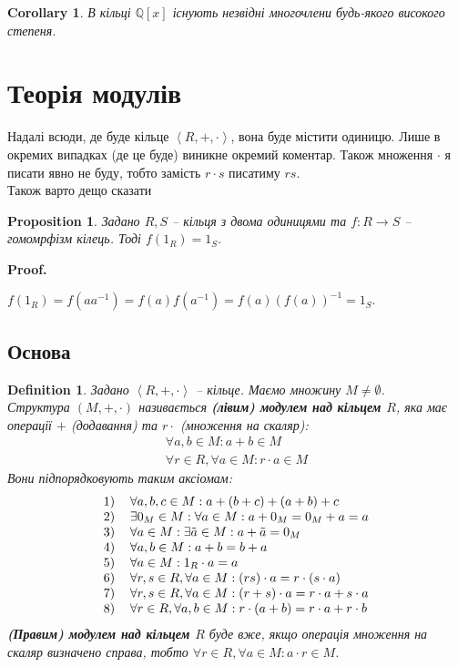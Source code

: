 \documentclass[a4paper, 10pt]{article}
\makeatletter
\theoremstyle{theoremdd}
\theoremstyle{theoremdd}
\newtheorem{definition}[theorem]{Definition}
\theoremstyle{theoremdd}
\theoremstyle{theoremdd}
\theoremstyle{theoremdd}
\theoremstyle{theoremdd}
\theoremstyle{theoremdd}
\theoremstyle{theoremdd}
\theoremstyle{theoremdd}
\newtheorem{proposition}[theorem]{Proposition}
\theoremstyle{theoremdd}
\theoremstyle{theoremdd}
\theoremstyle{theoremdd}
\theoremstyle{theoremdd}
\theoremstyle{theoremdd}
\newtheorem{corollary}[theorem]{Corollary}
\theoremstyle{theoremdd}
\renewenvironment{proof}[1][Proof.\\]{\par
\pushQED{\hfill \qed}%
\normalfont \topsep6\p@\@plus6\p@\relax
\trivlist
\item\relax
{\bfseries
#1\@addpunct{.}}\hspace\labelsep\ignorespaces
}{%
\popQED\endtrivlist\@endpefalse
}
\makeatother
\begin{document}
\begin{corollary}
В кільці $\mathbb{Q}[x]$ існують незвідні многочлени будь-якого високого степеня.
\end{corollary}

\newpage
\section{Теорія модулів}
Надалі всюди, де буде кільце $\left< R,+,\cdot\right>$, вона буде містити одиницю. Лише в окремих випадках (де це буде) виникне окремий коментар. Також множення $\cdot$ я писати явно не буду, тобто замість $r \cdot s$ писатиму $rs$.
\bigskip \\
Також варто дещо сказати
\begin{proposition}
Задано $R,S$ -- кільця з двома одиницями та $f \colon R \to S$ -- гомомрфізм кілець. Тоді $f(1_R) = 1_S$.
\end{proposition}

\begin{proof}
$f(1_R) = f(aa^{-1}) = f(a)f(a^{-1}) = f(a)(f(a))^{-1} = 1_S$.
\end{proof}

\subsection{Основа}
\begin{definition}
Задано $\left< R,+,\cdot \right>$ -- кільце. Маємо множину $M \neq \emptyset$.\\
Структура $(M,+,\cdot)$ називається \textbf{(лівим) модулем над кільцем $R$}, яка має операції $+$ (додавання) та $r \cdot$ (множення на скаляр):
\begin{align*}
\forall a,b \in M: a+b \in M \\
\forall r \in R, \forall a \in M: r \cdot a \in M
\end{align*}
Вони підпорядковують таким аксіомам:
\begin{align*}
	\begin{tabular}{cl}
	1) & $\forall a,b,c \in M: a + (b + c) + (a + b) + c$\\
	2) & $\exists 0_M \in M: \forall a \in M: a + 0_M = 0_M + a = a$\\
	3) & $\forall a \in M: \exists \tilde{a} \in M: a + \tilde{a} = 0_M$\\
	4) & $\forall a,b \in M: a + b = b + a$\\
	5) & $\forall a \in M: 1_R \cdot a = a$\\
	6) & $\forall r,s \in R, \forall a \in M: (rs) \cdot a = r \cdot (s \cdot a)$\\
	7) & $\forall r,s \in R, \forall a \in M: (r+s) \cdot a = r \cdot a + s \cdot a$ \\
	8) & $\forall r \in R, \forall a,b \in M: r \cdot (a+b) = r \cdot a + r \cdot b$
	\end{tabular}
	\end{align*}
\textbf{(Правим) модулем над кільцем $R$} буде вже, якщо операція множення на скаляр визначено справа, тобто $\forall r \in R, \forall a \in M: a \cdot r \in M$.
\end{definition}
\end{document}
